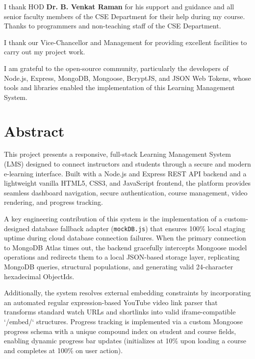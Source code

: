 \documentclass[12pt,a4paper]{report}
\begin{document}
I thank HOD \textbf{Dr. B. Venkat Raman} for his support and guidance and all senior faculty members of the CSE Department for their help during my course. Thanks to programmers and non-teaching staff of the CSE Department.

I thank our Vice-Chancellor and Management for providing excellent facilities to carry out my project work.

I am grateful to the open-source community, particularly the developers of Node.js, Express, MongoDB, Mongoose, BcryptJS, and JSON Web Tokens, whose tools and libraries enabled the implementation of this Learning Management System.

\vspace{1.5cm}

\clearpage

\chapter*{Abstract}

This project presents a responsive, full-stack Learning Management System (LMS) designed to connect instructors and students through a secure and modern e-learning interface. Built with a Node.js and Express REST API backend and a lightweight vanilla HTML5, CSS3, and JavaScript frontend, the platform provides seamless dashboard navigation, secure authentication, course management, video rendering, and progress tracking. 

A key engineering contribution of this system is the implementation of a custom-designed database fallback adapter (\texttt{mockDB.js}) that ensures 100\% local staging uptime during cloud database connection failures. When the primary connection to MongoDB Atlas times out, the backend gracefully intercepts Mongoose model operations and redirects them to a local JSON-based storage layer, replicating MongoDB queries, structural populations, and generating valid 24-character hexadecimal ObjectIds. 

Additionally, the system resolves external embedding constraints by incorporating an automated regular expression-based YouTube video link parser that transforms standard watch URLs and shortlinks into valid iframe-compatible `/embed/` structures. Progress tracking is implemented via a custom Mongoose progress schema with a unique compound index on student and course fields, enabling dynamic progress bar updates (initializes at 10\% upon loading a course and completes at 100\% on user action). 
\end{document}
